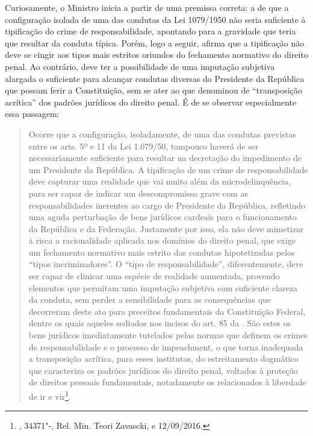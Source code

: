 Curiosamente, o Ministro inicia a partir de uma premissa correta: a de
que a configuração isolada de uma das condutas da Lei 1079/1950 não
seria suficiente à tipificação do crime de responsabilidade, apontando
para a gravidade que teria que resultar da conduta típica. Porém, logo a
seguir, afirma que a tipificação não deve se cingir aos tipos mais
estritos oriundos do fechamento normativo do direito penal. Ao
contrário, deve ter a possibilidade de uma imputação subjetiva alargada
o suficiente para alcançar condutas diversas do Presidente da República
que possam ferir a Constituição, sem se ater ao que denominou de
``transposição acrítica'' dos padrões jurídicos do direito penal. É de
se observar especialmente essa passagem:

\begin{quote}
Ocorre que a configuração, isoladamente, de uma das condutas previstas
entre os arts. 5º e 11 da Lei 1.079/50, tampouco haverá de ser
necessariamente suficiente para resultar na decretação do impedimento de
um Presidente da República. A tipificação de um crime de
responsabilidade deve capturar uma realidade que vai muito além da
microdelinquência, para ser capaz de indicar um descompromisso grave com
as responsabilidades inerentes ao cargo de Presidente da República,
refletindo uma aguda perturbação de bens jurídicos cardeais para o
funcionamento da República e da Federação. Justamente por isso, ela não
deve mimetizar à risca a racionalidade aplicada nos domínios do direito
penal, que exige um fechamento normativo mais estrito das condutas
hipotetizadas pelos ``tipos incriminadores''. O ``tipo de
responsabilidade'', diferentemente, deve ser capaz de clinicar uma
espécie de realidade aumentada, provendo elementos que permitam uma
imputação subjetiva com suficiente clareza da conduta, sem perder a
sensibilidade para as consequências que decorreram deste ato para
preceitos fundamentais da Constituição Federal, dentre os quais aqueles
sediados nos incisos do art. 85 da . São estes os bens jurídicos
imediatamente tutelados pelas normas que definem os crimes de
responsabilidade e o processo de impeachment, o que torna
inadequada a transposição acrítica, para esses institutos, do
estreitamento dogmático que caracteriza os padrões jurídicos do direito
penal, voltados à proteção de direitos pessoais fundamentais,
notadamente os relacionados à liberdade de ir e vir\footnote{,  34371"-,
Rel. Min. Teori Zavascki, e 12/09/2016.}.
\end{quote}


